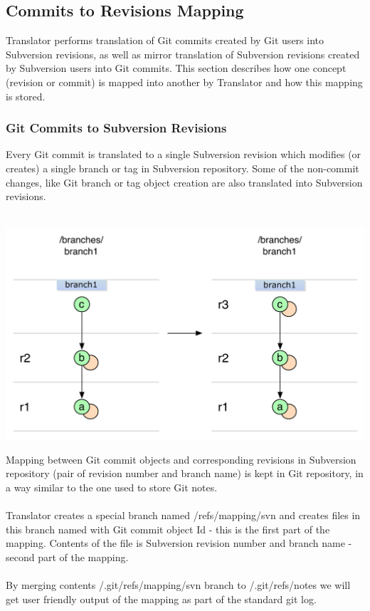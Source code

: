 \subsection{Commits to Revisions Mapping}
\renewcommand{\figurename}{Diagram}

Translator performs translation of Git commits created by Git users into Subversion revisions, as well
as mirror translation of Subversion revisions created by Subversion users into Git commits. This section
describes how one concept (revision or commit) is mapped into another by Translator and how this mapping 
is stored.

\subsubsection{Git Commits to Subversion Revisions}

Every Git commit is translated to a single Subversion revision which modifies (or creates) a single branch or tag
in Subversion repository. Some of the non-commit changes, like Git branch or tag object creation are also translated into Subversion revisions.\\\\
\begin{center}
\includegraphics[width=\textwidth]{img/diagrams/single_change_git_to_svn.pdf}%
\label{simple_git_to_svn}%
\end{center}

Mapping between Git commit objects and corresponding revisions in Subversion repository (pair of revision number and branch name) is 
kept in Git repository, in a way similar to the one used to store Git notes. 
\\\\
Translator creates a special branch named /refs/mapping/svn and creates files in this branch named with Git commit object Id - this is the first part of the mapping. %
Contents of the file is Subversion revision number and branch name - second part of the mapping.
\\\\ 
By merging contents /.git/refs/mapping/svn branch to /.git/refs/notes we will get user friendly output of the mapping as part of the standard git log.

